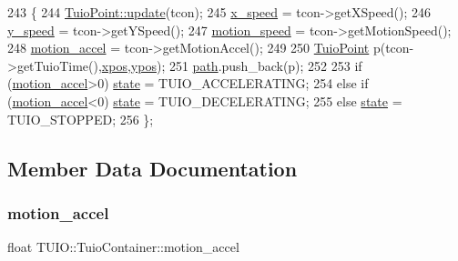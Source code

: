 \begin{DoxyCode}
243                                                   \{
244             \hyperlink{class_t_u_i_o_1_1_tuio_point_aa1cc8711747080dd00eb50577d73d038}{TuioPoint::update}(tcon);
245             \hyperlink{class_t_u_i_o_1_1_tuio_container_a5ee28d0495d5cc4fa331ed0b14b9e176}{x\_speed} = tcon->getXSpeed();
246             \hyperlink{class_t_u_i_o_1_1_tuio_container_a2499ba8d5c0d8ca4afc3b55ddff4ff1a}{y\_speed} =  tcon->getYSpeed();
247             \hyperlink{class_t_u_i_o_1_1_tuio_container_a7810725234e427d4508f6b6a9874723b}{motion\_speed} =  tcon->getMotionSpeed();
248             \hyperlink{class_t_u_i_o_1_1_tuio_container_adaa20f12158aee41f7502da330f2a97e}{motion\_accel} = tcon->getMotionAccel();
249             
250             \hyperlink{class_t_u_i_o_1_1_tuio_point_a8611528cf41b797c51d6a9bf324157a5}{TuioPoint} p(tcon->getTuioTime(),\hyperlink{class_t_u_i_o_1_1_tuio_point_a0021f8dfddd05f2a17e713a94f5457e6}{xpos},\hyperlink{class_t_u_i_o_1_1_tuio_point_a89a038775a681166168735dbc95c7779}{ypos});
251             \hyperlink{class_t_u_i_o_1_1_tuio_container_a4bdb8935091e0736b6c19ce9fd676b9a}{path}.push\_back(p);
252             
253             \textcolor{keywordflow}{if} (\hyperlink{class_t_u_i_o_1_1_tuio_container_adaa20f12158aee41f7502da330f2a97e}{motion\_accel}>0) \hyperlink{class_t_u_i_o_1_1_tuio_container_a61cfc66997d3d2f2a503e20bd29ddbf1}{state} = TUIO\_ACCELERATING;
254             \textcolor{keywordflow}{else} \textcolor{keywordflow}{if} (\hyperlink{class_t_u_i_o_1_1_tuio_container_adaa20f12158aee41f7502da330f2a97e}{motion\_accel}<0) \hyperlink{class_t_u_i_o_1_1_tuio_container_a61cfc66997d3d2f2a503e20bd29ddbf1}{state} = TUIO\_DECELERATING;
255             \textcolor{keywordflow}{else} \hyperlink{class_t_u_i_o_1_1_tuio_container_a61cfc66997d3d2f2a503e20bd29ddbf1}{state} = TUIO\_STOPPED;
256         \};
\end{DoxyCode}


\subsection{Member Data Documentation}
\mbox{\label{class_t_u_i_o_1_1_tuio_container_adaa20f12158aee41f7502da330f2a97e}} 
\subsubsection{\texorpdfstring{motion\+\_\+accel}{motion\_accel}}
{\footnotesize\ttfamily float T\+U\+I\+O\+::\+Tuio\+Container\+::motion\+\_\+accel\hspace{0.3cm}{\ttfamily [protected]}}

